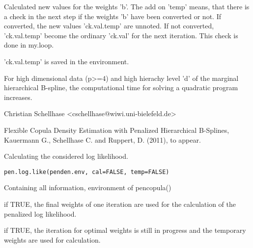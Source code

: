 \documentclass[a4paper]{book}
\begin{document}
%
\begin{Value}
\begin{ldescription}
\item[\code{ck.val.temp}] Calculated new values for the weights 'b'. The add
on 'temp' means, that there is a check in the next step if the
weights 'b' have been converted or not. If converted, the new values
'ck.val.temp' are unnoted. If not converted, 'ck.val.temp' become
the ordinary 'ck.val' for the next iteration. This check is done in my.loop.
\end{ldescription}
'ck.val.temp' is saved in the environment.
\end{Value}
%
\begin{Note}\relax
For high dimensional data (p>=4) and high hierachy level 'd' of the
marginal hierarchical B-spline, the computational time for solving a
quadratic program increases.

\end{Note}
%
\begin{Author}\relax
Christian Schellhase <cschellhase@wiwi.uni-bielefeld.de>
\end{Author}
%
\begin{References}\relax
Flexible Copula Density Estimation with Penalized
Hierarchical B-Splines, Kauermann G., Schellhase C. and Ruppert, D. (2011), to appear.
\end{References}
%
\begin{Description}\relax
Calculating the considered log likelihood.
\end{Description}
%
\begin{Usage}
\begin{verbatim}
pen.log.like(penden.env, cal=FALSE, temp=FALSE)
\end{verbatim}
\end{Usage}
%
\begin{Arguments}
\begin{ldescription}
\item[\code{penden.env}] Containing all information, environment of pencopula()
\item[\code{cal}] if TRUE, the final weights of one iteration are used for
the calculation of the penalized log likelihood.
\item[\code{temp}] if TRUE, the iteration for optimal weights is still in
progress and the temporary weights are used for calculation.
\end{ldescription}
\end{Arguments}
\end{document}
